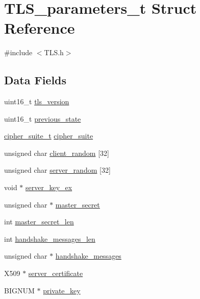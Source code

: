 \hypertarget{struct_t_l_s__parameters__t}{}\section{T\+L\+S\+\_\+parameters\+\_\+t Struct Reference}
\label{struct_t_l_s__parameters__t}


{\ttfamily \#include $<$T\+L\+S.\+h$>$}

\subsection*{Data Fields}
\begin{DoxyCompactItemize}
\item 
uint16\+\_\+t \hyperlink{struct_t_l_s__parameters__t_a8fd63193690a09b75e0aaf9b971ed3df}{tls\+\_\+version}
\item 
uint16\+\_\+t \hyperlink{struct_t_l_s__parameters__t_a7876cd7f12771bb13dfd180e2d74e02b}{previous\+\_\+state}
\item 
\hyperlink{structcipher__suite__t}{cipher\+\_\+suite\+\_\+t} \hyperlink{struct_t_l_s__parameters__t_af1d8ebe57a775be2b91550dbcacb2a58}{cipher\+\_\+suite}
\item 
unsigned char \hyperlink{struct_t_l_s__parameters__t_adbdca8d573a8e073ef16bf14229fb4c9}{client\+\_\+random} \mbox{[}32\mbox{]}
\item 
unsigned char \hyperlink{struct_t_l_s__parameters__t_a9159f146fbc286a8b55f4aa83396ae2f}{server\+\_\+random} \mbox{[}32\mbox{]}
\item 
void $\ast$ \hyperlink{struct_t_l_s__parameters__t_a8ca08ac851747e17048fddf461c65ec4}{server\+\_\+key\+\_\+ex}
\item 
unsigned char $\ast$ \hyperlink{struct_t_l_s__parameters__t_a68c2015df5cb7259aa1abdee33c8e6f3}{master\+\_\+secret}
\item 
int \hyperlink{struct_t_l_s__parameters__t_a7112487b636ca7921055d94ae02478fe}{master\+\_\+secret\+\_\+len}
\item 
int \hyperlink{struct_t_l_s__parameters__t_afbdbb7d32255aef8951f95ccc44957fc}{handshake\+\_\+messages\+\_\+len}
\item 
unsigned char $\ast$ \hyperlink{struct_t_l_s__parameters__t_ac6734c87e703c22f7d34f71ca116d005}{handshake\+\_\+messages}
\item 
X509 $\ast$ \hyperlink{struct_t_l_s__parameters__t_a832ae425d6bb6330e1e5e825ab85ac31}{server\+\_\+certificate}
\item 
B\+I\+G\+N\+UM $\ast$ \hyperlink{struct_t_l_s__parameters__t_aa7d109714bb4c1faa6aba18c0dd3dcae}{private\+\_\+key}
\end{DoxyCompactItemize}


